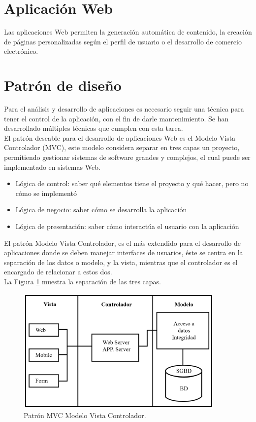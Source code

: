 


\section{Aplicación Web}
Las aplicaciones Web permiten la generación automática de contenido, la creación de páginas personalizadas según el perfil de usuario o el desarrollo de comercio electrónico.

\section{Patrón de diseño}
Para el análisis y desarrollo de aplicaciones es necesario seguir una técnica para tener el control de la aplicación, con el fin de darle mantenimiento. Se han desarrollado múltiples técnicas que cumplen con esta tarea.\\


El patrón deseable para el desarrollo de aplicaciones Web es el Modelo Vista Controlador (MVC), este modelo considera separar en tres capas un proyecto, permitiendo gestionar sistemas de software grandes y complejos, el cual puede ser implementado en sistemas Web.

\begin{itemize}
	\item Lógica de control: saber qué elementos tiene el proyecto y qué hacer, pero no cómo se implementó
	\item Lógica de negocio: saber cómo se desarrolla la aplicación
	\item Lógica de presentación: saber cómo interactúa el usuario con la aplicación
\end{itemize}
El patrón Modelo Vista Controlador, es el más extendido para el desarrollo de aplicaciones donde se deben manejar interfaces de usuarios, éste se centra en la separación de los datos o modelo, y la vista, mientras que el controlador es el encargado de relacionar a estos dos.
\\
La Figura \ref{fig:modVisCont} muestra la separación de las tres capas.
\begin{figure}[H]
  \centering
  \includegraphics[scale=.50]{imagenes/Capitulo3/mvc.png}
  \caption{Patrón MVC Modelo Vista Controlador.}
  \label{fig:modVisCont}
\end{figure}

